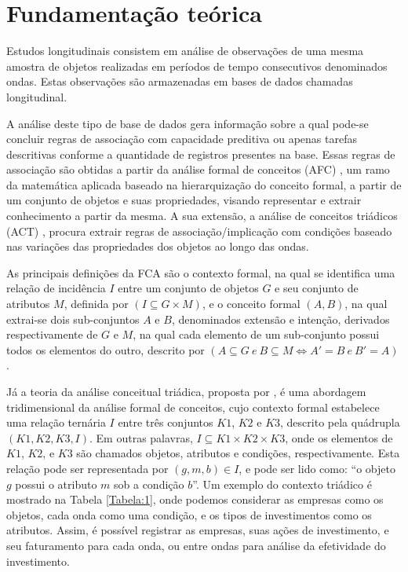 \documentclass[kdmile,a4paper]{kdmile} %
\begin{document}
\section{Fundamentação teórica}

Estudos longitudinais consistem em análise de observações de uma mesma amostra de objetos realizadas em períodos de tempo consecutivos denominados ondas. Estas observações são armazenadas em bases de dados chamadas longitudinal.

A análise deste tipo de base de dados gera informação sobre a qual pode-se concluir regras de associação com capacidade preditiva ou apenas tarefas descritivas conforme a quantidade de registros presentes na base. Essas regras de associação são obtidas a partir da análise formal de conceitos (AFC) \cite{wille:95}, um ramo da matemática aplicada baseado na hierarquização do conceito formal, a partir de um conjunto de objetos e suas propriedades, visando representar e extrair conhecimento a partir da mesma. A sua extensão, a análise de conceitos triádicos (ACT) \cite{lehmann:95}, procura extrair regras de associação/implicação com condições baseado nas variações das propriedades dos objetos ao longo das ondas.

As principais definições da FCA são o contexto formal, na qual se identifica uma relação de incidência $I$ entre um conjunto de objetos $G$ e seu conjunto de atributos $M$, definida por $(I\subseteq{G \times M})$, e o conceito formal $(A,B)$, na qual extrai-se dois sub-conjuntos $A$ e $B$, denominados extensão e intenção, derivados respectivamente de $G$ e $M$, na qual cada elemento de um sub-conjunto possui todos os elementos do outro, descrito por $(A \subseteq{G} \ e \ B \subseteq{M} \iff A' = B \ e \ B' = A)$.

Já a teoria da análise conceitual triádica, proposta por \cite{lehmann:95}, é uma abordagem tridimensional da análise formal de conceitos, cujo contexto formal estabelece uma relação ternária $I$ entre três conjuntos $K1$, $K2$ e $K3$, descrito pela quádrupla $(K1, K2, K3, I)$. Em outras palavras, $I \subseteq K1 \times K2 \times K3$, onde os elementos de $K1$, $K2$, e $K3$ são chamados objetos, atributos e condições, respectivamente. Esta relação pode ser representada por $(g,m,b) \in I$, e pode ser lido como: “o objeto $g$ possui o atributo $m$ sob a condição $b$”. Um exemplo do contexto triádico é mostrado na Tabela \ref{Tabela:1}, onde podemos considerar as empresas como os objetos, cada onda como uma condição, e os tipos de investimentos como os atributos. Assim, é possível registrar as empresas, suas ações de investimento, e seu faturamento para cada onda, ou entre ondas para análise da efetividade do investimento.
\end{document}
